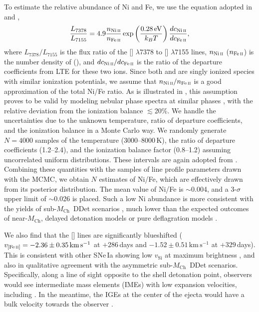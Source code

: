 \documentclass[twocolumn]{aastex631}
\newcommand{\Mch}{$M_\mathrm{Ch}$}
\begin{document}
\begin{CJK*}{UTF8}{gbsn}
To estimate the relative abundance of Ni and Fe, we use the equation adopted in \citet{Jerkstrand_2015} and \citet{Maguire_2018},
\begin{equation}
    \frac{L_{7378}}{L_{7155}} = 4.9\frac{n_{\mathrm{Ni}\,\textsc{ii}}}{n_{\mathrm{Fe}\,\textsc{ii}}}\exp\left(\frac{0.28\,\mathrm
    {eV}}{k_BT}\right)\frac{dc_{\mathrm{Ni}\,\textsc{ii}}}{dc_{\mathrm{Fe}\,\textsc{ii}}},
\end{equation}
where $L_{7378}/L_{7155}$ is the flux ratio of the [] $\lambda$7378 to [] $\lambda$7155 lines, $n_{\mathrm{Ni}\,\textsc{ii}}$ ($n_{\mathrm{Fe}\,\textsc{ii}}$) is the number density of  (), and ${dc_{\mathrm{Ni}\,\textsc{ii}}}/{dc_{\mathrm{Fe}\,\textsc{ii}}}$ is the ratio of the departure coefficients from LTE for these two ions. Since both  and  are singly ionized species with similar ionization potentials, we assume that $n_{\mathrm{Ni}\,\textsc{ii}}/n_{\mathrm{Fe}\,\textsc{ii}}$ is a good approximation of the total Ni/Fe ratio. As is illustrated in \citet{Maguire_2018}, this assumption proves to be valid by modeling nebular phase spectra at similar phases \citep{Fransson_2015,Shingles_2022}, with the relative deviation from the ionization balance $\lesssim$20\%. We handle the uncertainties due to the unknown temperature, ratio of departure coefficients, and the ionization balance in a Monte Carlo way. We randomly generate $N=4000$ samples of the temperature (3000--8000\,K), the ratio of departure coefficients (1.2--2.4), and the ionization balance factor (0.8--1.2) assuming uncorrelated uniform distributions. These intervals are again adopted from \citet{Maguire_2018}. Combining these quantities with the samples of line profile parameters drawn with the MCMC, we obtain $N$ estimates of Ni/Fe, which are effectively drawn from its posterior distribution. The mean value of Ni/Fe is $\sim$0.004, and a 3-$\sigma$ upper limit of $\sim$0.026 is placed. Such a low Ni abundance is more consistent with the yields of sub-\Mch\ DDet scenarios \citep{Shen_DD_2018}, much lower than the expected outcomes of near-\Mch, delayed detonation models \citep{Seitenzahl_2013} or pure deflagration models \citep{Iwamoto_1999}.

We also find that the [] lines are significantly blueshifted ($v_\mathrm{[Fe\,\textsc{ii}]}=-2.36\pm0.35\mathrm{\,km\,s^{-1}}$ at $+286$\,days and $-1.52\pm0.51\mathrm{\,km\,s^{-1}}$ at $+329$\,days). This is consistent with other SNe\,Ia showing low $v_\mathrm{Si}$ at maximum brightness \citep{Maeda_2010,Maguire_2018,Li_2021}, and also in qualitative agreement with the asymmetric sub-\Mch\ DDet scenarios. Specifically, along a line of sight opposite to the shell detonation point, observers would see intermediate mass elements (IMEs) with low expansion velocities, including . In the meantime, the IGEs at the center of the ejecta would have a bulk velocity towards the observer \citep{Fink_DD_2010,Bulla_2016}.


\end{CJK*}
\end{document}
